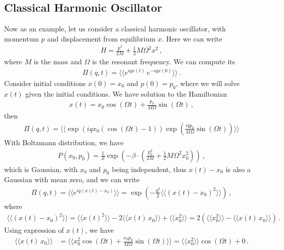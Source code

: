 \documentclass[11pt, oneside]{book}
\theoremstyle{break}
\theoremstyle{break}
\begin{document}
\subsection{Classical Harmonic Oscillator}
Now as an example, let us consider a classical harmonic oscillator, with momentum $p$ and displacement from equilibrium $x$. Here we can write
\begin{align*}
H = \frac{p^2}{2M} + \frac{1}{2}M\Omega^2 x^2\,,
\end{align*}
where $M$ is the mass and $\Omega$ is the resonant frequency. We can compute its 
\begin{align*}
\Pi(q,t) = \langle \langle e^{iq x(t)}\, e^{-iqx(0)}\rangle\rangle\,.
\end{align*}
Consider initial conditions $x(0) = x_0$ and $p(0) = p_0$, where we will solve $x(t)$ given the initial conditions. We have solution to the Hamiltonian 
\begin{align*}
x(t) = x_0 \cos(\Omega t)  + \frac{p_0}{M \Omega}\sin(\Omega t)\,,
\end{align*}
then 
\begin{align*}
\Pi(q,t) = \langle\langle \exp\left({iqx_0(\cos(\Omega t) -1)}\right) \exp\left( \frac{iqp_0}{M\Omega}\sin(\Omega t) \right) \rangle\rangle
\end{align*}
With Boltzmann distribution, we have 
\begin{align*}
P(x_0,p_0) = \frac{1}{Z}\exp\left( -\beta\cdot \left( \frac{p_0^2}{2M} + \frac{1}{2}M\Omega^2x_0^2\right) \right)\,, 
\end{align*}
which is Gaussian, with $x_0$ and $p_0$ being independent, thus $x(t) - x_0$ is also a Gaussian with mean zero, and we can write
\begin{align*}
\Pi(q,t) = \langle\langle e^{iq(x(t) - x_0)}\rangle\rangle = 
\exp\left( -\frac{q^2}{2}
\langle \langle
(x(t)-x_0)^2
\rangle\rangle
\right)\,,
\end{align*}
where 
\begin{align*}
\langle \langle
(x(t)-x_0)^2
\rangle\rangle = 
\langle\langle x(t)^2\rangle\rangle - 2\langle\langle x(t) \, x_0\rangle\rangle + \langle\langle x_0^2\rangle\rangle = 2\left( \langle\langle x_0^2\rangle\rangle - \langle\langle x(t) \, x_0\rangle\rangle\right)\,.
\end{align*}
Using expression of $x(t)$, we have
\begin{align*}
\langle\langle x(t) \, x_0\rangle\rangle 
&= \langle\langle x_0^2 \cos(\Omega t) + \frac{x_0p_0}{M\Omega} \sin(\Omega t) \rangle\rangle = \langle\langle x_0^2\rangle\rangle \cos(\Omega t)  + 0\,.
\end{align*}
\end{document}
